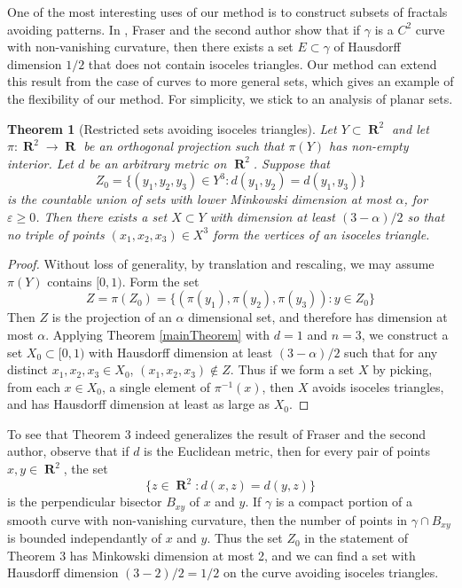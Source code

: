 \documentclass[dvipsnames,letterpaper,12pt]{article}
\numberwithin{equation}{section}
\theoremstyle{plain}
\newtheorem{theorem}{Theorem}
\theoremstyle{remark}
\DeclareMathOperator{\RR}{\mathbf{R}}
\begin{document}
One of the most interesting uses of our method is to construct subsets of fractals avoiding patterns. In \cite{MalabikaRob}, Fraser and the second author show that if $\gamma$ is a $C^2$ curve with non-vanishing curvature, then there exists a set $E \subset \gamma$ of Hausdorff dimension $1/2$ that does not contain isoceles triangles. Our method can extend this result from the case of curves to more general sets, which gives an example of the flexibility of our method. For simplicity, we stick to an analysis of planar sets.

\begin{theorem}[Restricted sets avoiding isoceles triangles]
	Let $Y \subset \RR^2$ and let $\pi: \RR^2 \to \RR$ be an orthogonal projection such that $\pi(Y)$ has non-empty interior. Let $d$ be an arbitrary metric on $\RR^2$. Suppose that
	\[ Z_0 = \{ (y_1, y_2, y_3) \in Y^3: d(y_1,y_2) = d(y_1,y_3) \} \]
	is the countable union of sets with lower Minkowski dimension at most $\alpha$, for $\varepsilon \geq 0$. Then there exists a set $X \subset Y$ with dimension at least $(3 - \alpha)/2$ so that no triple of points $(x_1, x_2, x_3) \in X^3$ form the vertices of an isoceles triangle.
\end{theorem}
\begin{proof}
	Without loss of generality, by translation and rescaling, we may assume $\pi(Y)$ contains $[0,1)$. Form the set
	\[ Z = \pi(Z_0) = \{ (\pi(y_1), \pi(y_2), \pi(y_3)) : y \in Z_0 \} \]
	Then $Z$ is the projection of an $\alpha$ dimensional set, and therefore has dimension at most $\alpha$. Applying Theorem \ref{mainTheorem} with $d = 1$ and $n = 3$, we construct a set $X_0 \subset [0,1)$ with Hausdorff dimension at least $(3 - \alpha)/2$ such that for any distinct $x_1,x_2,x_3 \in X_0$, $(x_1,x_2,x_3) \not \in Z$. Thus if we form a set $X$ by picking, from each $x \in X_0$, a single element of $\pi^{-1}(x)$, then $X$ avoids isoceles triangles, and has Hausdorff dimension at least as large as $X_0$.
\end{proof}

To see that Theorem 3 indeed generalizes the result of Fraser and the second author, observe that if $d$ is the Euclidean metric, then for every pair of points $x,y \in \RR^2$, the set
%
\[ \{ z \in \RR^2: d(x,z) = d(y,z) \} \]
%
is the perpendicular bisector $B_{xy}$ of $x$ and $y$. If $\gamma$ is a compact portion of a smooth curve with non-vanishing curvature, then the number of points in $\gamma \cap B_{xy}$ is bounded independantly of $x$ and $y$. Thus the set $Z_0$ in the statement of Theorem 3 has Minkowski dimension at most 2, and we can find a set with Hausdorff dimension $(3 - 2)/2 = 1/2$ on the curve avoiding isoceles triangles.
\end{document}
